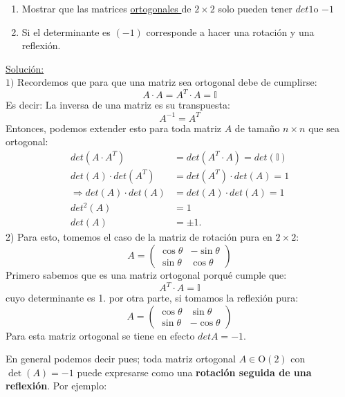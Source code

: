 \documentclass[a4paper,12pt]{article}
\begin{document}
\begin{tcolorbox}[colback=yellow!10, colframe=blue!60!white, title=Ejercicio]
\begin{enumerate}
    \item Mostrar que las matrices \underline{ortogonales } de $2 \times 2$ solo pueden tener $det 1 $o $-1$
    \item  Si el determinante es $(-1)$  corresponde a hacer una rotación y una reflexión. 
\end{enumerate}

\end{tcolorbox}
\fboxrule=3pt

 \fbox
{ 
\begin{minipage}{0.75\textwidth}
\underline{Solución:} \\
$1)$ Recordemos que para que una matriz sea ortogonal debe de cumplirse: 
\[
A \cdot A = A^T \cdot A = \mathbb{I}
\]
Es decir: La inversa de una matriz es su transpuesta:
\[
A^{-1} = A^T
\]
Entonces, podemos extender esto para toda matriz $A $ de tamaño $n \times n $ que sea ortogonal: 
\begin{align*}
det(A \cdot A^T ) &= det (A^T \cdot A )= det (\mathbb{I}) \\
det(A)\cdot det(A^T ) &= det(A^T ) \cdot det (A) =1\\
\Rightarrow det(A)\cdot det(A) &= det(A)\cdot det(A) = 1 \\
det^2(A)  &= 1\\
det(A) &= \pm 1.
\end{align*}
2) Para esto, tomemos el caso de la matriz de rotación pura en $2 \times 2$: 
\[
A=\begin{pmatrix}
\cos \theta &- \sin \theta \\
\sin \theta &\cos\theta
\end{pmatrix}
\]
Primero sabemos que es una matriz ortogonal porqué cumple que: 
\[
A^T \cdot A = \mathbb{I} 
\]
cuyo determinante es 1. 
por otra parte, si tomamos la reflexión pura: 
\[
A= \begin{pmatrix}
    \cos \theta & \sin \theta\\
    \sin \theta & - \cos\theta 
\end{pmatrix}
\]
Para esta matriz ortogonal se tiene en efecto $det A = -1.$

En general podemos decir pues; toda matriz ortogonal \( A \in \text{O}(2) \) con \(\det(A) = -1\) puede expresarse como una \textbf{rotación seguida de una reflexión}. Por ejemplo: \\


\end{minipage}}
\end{document}
